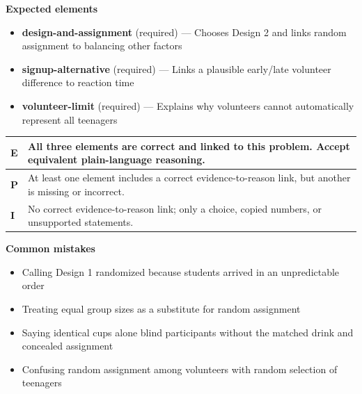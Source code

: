 \documentclass[11pt]{article}
\begin{document}

\textbf{Expected elements}
\begin{itemize}[leftmargin=1.5em,itemsep=2pt,topsep=2pt]
  \item \textbf{design-and-assignment} (required) --- Chooses Design 2 and links random assignment to balancing other factors
  \item \textbf{signup-alternative} (required) --- Links a plausible early/late volunteer difference to reaction time
  \item \textbf{volunteer-limit} (required) --- Explains why volunteers cannot automatically represent all teenagers
\end{itemize}

{\small\renewcommand{\arraystretch}{1.25}
\noindent\begin{tabular}{|p{0.5in}|p{5.9in}|}
\hline
\textbf{E} & All three elements are correct and linked to this problem. Accept equivalent plain-language reasoning. \\ \hline
\textbf{P} & At least one element includes a correct evidence-to-reason link, but another is missing or incorrect. \\ \hline
\textbf{I} & No correct evidence-to-reason link; only a choice, copied numbers, or unsupported statements. \\ \hline
\end{tabular}}

\textbf{Common mistakes}
\begin{itemize}[leftmargin=1.5em,itemsep=2pt,topsep=2pt]
  \item Calling Design 1 randomized because students arrived in an unpredictable order
  \item Treating equal group sizes as a substitute for random assignment
  \item Saying identical cups alone blind participants without the matched drink and concealed assignment
  \item Confusing random assignment among volunteers with random selection of teenagers
\end{itemize}

\clearpage
{}
\end{document}
